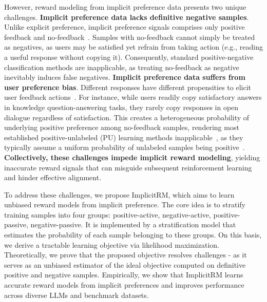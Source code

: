 \documentclass[]{arxiv_singlecolumn}
\theoremstyle{plain}
\theoremstyle{definition}
\theoremstyle{remark}
\begin{document}
However, reward modeling from implicit preference data presents two unique challenges.
 \textbf{Implicit preference data lacks definitive negative samples}. Unlike explicit preference, implicit preference signals comprises only positive feedback and no-feedback~\citep{wang2025icmlweak}. Samples with no-feedback cannot simply be treated as negatives, as users may be satisfied yet refrain from taking action (e.g., reading a useful response without copying it).  Consequently, standard positive-negative classification methods are inapplicable, as treating no-feedback as negative inevitably induces false negatives.
 \textbf{Implicit preference data suffers from user preference bias}. Different responses have different propensities to elicit user feedback actions~\citep{zheng2025unveiling,zheng2026uplift,li2024nipsremoving,li2024icmlrelaxing}. For instance, while users readily copy satisfactory answers in knowledge question-answering tasks, they rarely copy responses in open dialogue regardless of satisfaction. This creates a heterogeneous probability of underlying positive preference among no-feedback samples, rendering most established positive-unlabeled (PU) learning methods inapplicable~\citep{wang2025icmlweak,zhou2025counterfactual}, as they typically assume a uniform probability of unlabeled samples being positive~\citep{lagam}.
\textbf{Collectively, these challenges impede implicit reward modeling}, yielding inaccurate reward signals that can misguide subsequent reinforcement learning and hinder effective alignment. 


To address these challenges, we propose ImplicitRM, which aims to learn unbiased reward models from implicit preference. The core idea is to stratify training samples into four groups: positive-active, negative-active, positive-passive, negative-passive. It is implemented by a stratification model that estimates the probability of each sample belonging to these groups.  On this basis, we derive a tractable learning objective via likelihood maximization. Theoretically, we prove that the proposed objective resolves  challenges - as it serves as an unbiased estimator of the ideal objective computed on definitive positive and negative samples. Empirically, we show that ImplicitRM learns accurate reward models from implicit preferences and improves performance across diverse LLMs and benchmark datasets.
\end{document}
